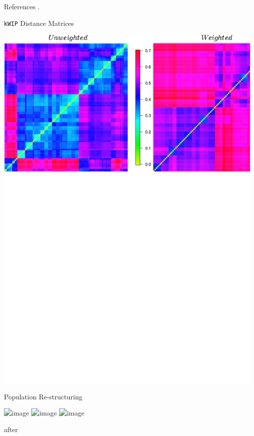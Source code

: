 \documentclass[t]{beamer}
\begin{document}
\begin{frame}[shrink=20]{References}
  \printbibliography
  \vfill
  .
\end{frame}

\begin{frame}{\texttt{kWIP} Distance Matrices}
  \begin{center}
    \includegraphics[width=\textwidth]{img/weight-unweight.png}
  \end{center}
\end{frame}

\begin{frame}{Population Re-structuring}
  \begin{center}
    \includegraphics<1>[width=\textwidth]{img/restruct-1}
    \includegraphics<2>[width=\textwidth]{img/restruct-2}
    \includegraphics<3>[width=\textwidth]{img/restruct-3}
  \end{center}

  \tiny{after \textcite{brachi_genome-wide_2011}}
\end{frame}
\end{document}
